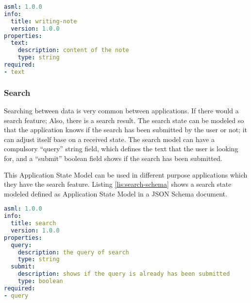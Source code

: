 \lstset{
  label=lis:note-schema, caption=Note Writing example Application State Model as JSON Schema in YAML.
}
\begin{lstlisting}[language=yaml]
asml: 1.0.0
info:
  title: writing-note
  version: 1.0.0
properties:
  text:
    description: content of the note
    type: string
required:
- text

\end{lstlisting}
\subsubsection{Search}
Searching between data is very common between applications. If there would a search feature; Also, there is a search result. The search state can be modeled so that the application knows if the search has been submitted by the user or not; it can adjust itself base on a received state. The search model can have a compulsory “query” string field, which defines the text that the user is looking for, and a “submit” boolean field shows if the search has been submitted.

This Application State Model can be used in different purpose applications which they have the search feature. Listing \ref{lis:search-schema} shows a search state modeled defined as Application State Model in a JSON Schema document.

\lstset{
  label=lis:search-schema, caption=Search example Application State Model as JSON Schema in YAML.
}
\begin{lstlisting}[language=yaml]
asml: 1.0.0
info:
  title: search
  version: 1.0.0
properties:
  query:
    description: the query of search
    type: string
  submit:
    description: shows if the query is already has been submitted
    type: boolean
required:
- query
\end{lstlisting}